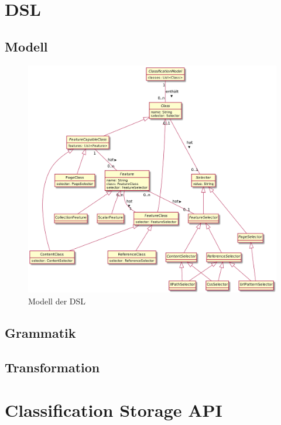 \chapter{DSL}
    \label{appendix:dsl}
    \section{Modell}
        \begin{figure}[htb]
            \centering
            \includegraphics[width=\textwidth]{../resources/dsl/model.png}
            \caption{Modell der DSL}
            \label{image:dslCompleteModel}
        \end{figure}
    
    \section{Grammatik}
        

    \section{Transformation}
        

\chapter{Classification Storage API}
    